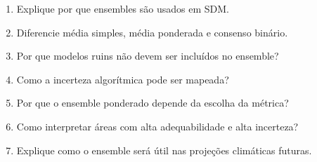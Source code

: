 \begin{enumerate}
	\item Explique por que ensembles são usados em SDM.
	\item Diferencie média simples, média ponderada e consenso binário.
	\item Por que modelos ruins não devem ser incluídos no ensemble?
	\item Como a incerteza algorítmica pode ser mapeada?
	\item Por que o ensemble ponderado depende da escolha da métrica?
	\item Como interpretar áreas com alta adequabilidade e alta incerteza?
	\item Explique como o ensemble será útil nas projeções climáticas futuras.
\end{enumerate}


